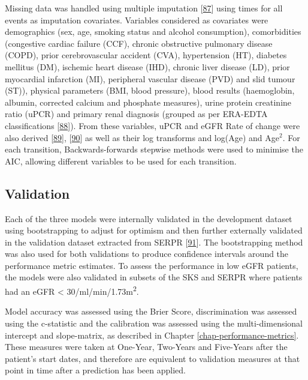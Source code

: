\documentclass[12pt,PhD,twoside,openright]{muthesis}
\begin{document}
Missing data was handled using multiple imputation {[}\protect\hyperlink{ref-white_imputing_2009}{87}{]} using times for all events as imputation covariates. Variables considered as covariates were demographics (sex, age, smoking status and alcohol consumption), comorbidities (congestive cardiac failure (CCF), chronic obstructive pulmonary disease (COPD), prior cerebrovascular accident (CVA), hypertension (HT), diabetes mellitus (DM), ischemic heart disease (IHD), chronic liver disease (LD), prior myocardial infarction (MI), peripheral vascular disease (PVD) and slid tumour (ST)), physical parameters (BMI, blood pressure), blood results (haemoglobin, albumin, corrected calcium and phosphate measures), urine protein creatinine ratio (uPCR) and primary renal diagnosis (grouped as per ERA-EDTA classifications {[}\protect\hyperlink{ref-venkat-raman_new_2012}{88}{]}). From these variables, uPCR and eGFR Rate of change were also derived {[}\protect\hyperlink{ref-kovesdy_past_2016}{89}{]}, {[}\protect\hyperlink{ref-naimark_past_2016}{90}{]} as well as their log transforms and log(Age) and Age\(^2\). For each transition, Backwards-forwards stepwise methods were used to minimise the AIC, allowing different variables to be used for each transition.

\hypertarget{validation}{%
\subsection{Validation}\label{validation}}

Each of the three models were internally validated in the development dataset using bootstrapping to adjust for optimism and then further externally validated in the validation dataset extracted from SERPR {[}\protect\hyperlink{ref-schomaker_bootstrap_2018}{91}{]}. The bootstrapping method was also used for both validations to produce confidence intervals around the performance metric estimates. To assess the performance in low eGFR patients, the models were also validated in subsets of the SKS and SERPR where patients had an eGFR \textless{} 30/ml/min/1.73m\textsuperscript{2}.

Model accuracy was assessed using the Brier Score, discrimination was assessed using the c-statistic and the calibration was assessed using the multi-dimensional intercept and slope-matrix, as described in Chapter \ref{chap-performance-metrics}. These measures were taken at One-Year, Two-Years and Five-Years after the patient's start dates, and therefore are equivalent to validation measures at that point in time after a prediction has been applied.
\end{document}
